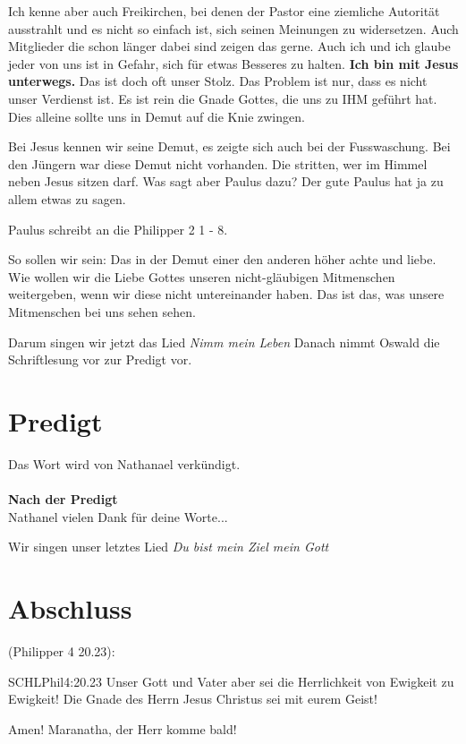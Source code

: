 \documentclass{../inc/mybib}
\begin{document}
Ich kenne aber auch Freikirchen, bei denen der Pastor eine ziemliche Autorität ausstrahlt und es nicht so einfach ist, sich seinen Meinungen zu widersetzen. Auch Mitglieder die schon länger \glqq dabei sind\grqq{} zeigen das gerne. Auch ich und ich glaube jeder von uns ist in Gefahr, sich für etwas Besseres zu halten. \textbf{Ich bin mit Jesus unterwegs.} Das ist doch oft unser Stolz. Das Problem ist nur, dass es nicht unser Verdienst ist. Es ist rein die Gnade Gottes, die uns zu IHM geführt hat. Dies alleine sollte uns in Demut auf die Knie zwingen.

Bei Jesus kennen wir seine Demut, es zeigte sich auch bei der Fusswaschung. Bei den Jüngern war diese Demut nicht vorhanden. Die stritten, wer im Himmel neben Jesus sitzen darf. Was sagt aber Paulus dazu? Der gute Paulus hat ja zu allem etwas zu sagen.

Paulus schreibt an die Philipper 2 1 - 8.

So sollen wir sein: Das in der Demut einer den anderen höher achte und liebe. Wie wollen wir die Liebe Gottes unseren nicht-gläubigen Mitmenschen weitergeben, wenn wir diese nicht untereinander haben. Das ist das, was unsere Mitmenschen bei uns sehen sehen.

Darum singen wir jetzt das Lied \textit{Nimm mein Leben}
Danach nimmt Oswald die Schriftlesung vor zur Predigt vor.

\section{Predigt}
Das Wort wird von Nathanael verkündigt.
\\
\\
\textbf{Nach der Predigt}\\
Nathanel vielen Dank für deine Worte...

Wir singen unser letztes Lied \textit{Du bist mein Ziel mein Gott}

\section{Abschluss}
(Philipper 4 20.23):
\begin{bibelbox}{SCHL}{Phil}{4:20.23}
Unser Gott und Vater aber sei die Herrlichkeit von Ewigkeit zu Ewigkeit!
Die Gnade des Herrn Jesus Christus sei mit eurem Geist!
\end{bibelbox}
Amen! Maranatha, der Herr komme bald!
\end{document}
